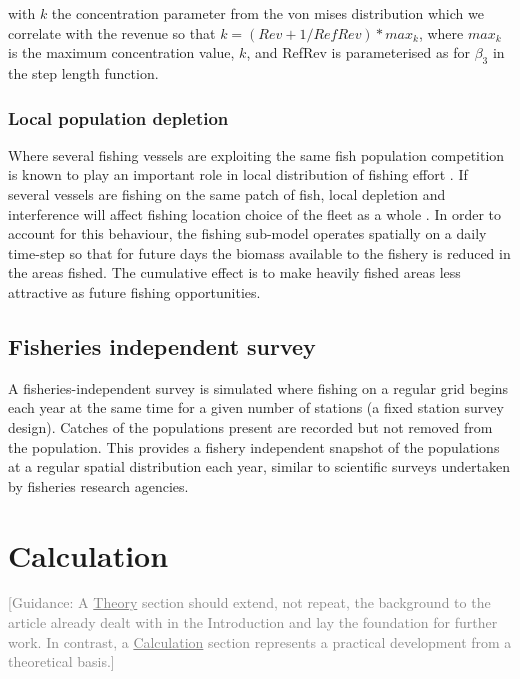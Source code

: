 \documentclass[review]{elsarticle}
\begin{document}
with $k$ the concentration parameter from the von mises distribution which we
correlate with the revenue so that $k = (Rev + 1 / RefRev) * max_{k}$,
where $max_{k}$ is the maximum concentration value, $k$, and RefRev is
parameterised as for $\beta_{3}$ in the step length function. 

\subsubsection{Local population depletion}

Where several fishing vessels are exploiting the same fish population
competition is known to play an important role in local distribution of fishing
effort \cite{Gillis1998}. If several vessels are fishing on the same patch of
fish, local depletion and interference will affect fishing location choice of
the fleet as a whole \cite{Rijnsdorp2000, Poos2007a}. In order to account for
this behaviour, the fishing sub-model operates spatially on a daily time-step
so that for future days the biomass available to the fishery is reduced in the
areas fished. The cumulative effect is to make heavily fished areas less
attractive as future fishing opportunities. 

\subsection{Fisheries independent survey}

A fisheries-independent survey is simulated where fishing on a regular grid
begins each year at the same time for a given number of stations (a fixed
station survey design). Catches of the populations present are recorded but not
removed from the population. This provides a fishery independent snapshot of
the populations at a regular spatial distribution each year, similar to
scientific surveys undertaken by fisheries research agencies. 

\section{Calculation}

\textcolor{gray}{[Guidance: A \underline{Theory} section should extend, not
repeat, the background to the article already dealt with in the	Introduction
and lay the foundation for further work.  In contrast, a
\underline{Calculation} section represents a practical development from a
theoretical basis.] \\}
\end{document}
